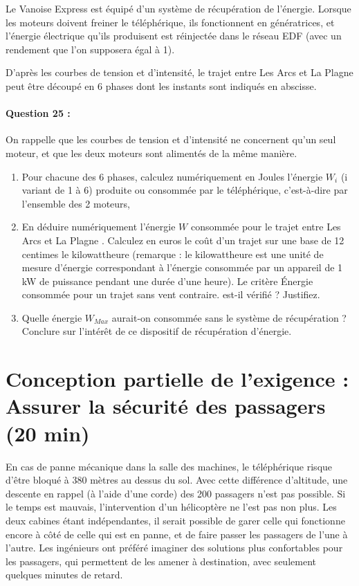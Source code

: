 Le Vanoise Express est équipé d'un système de récupération de l'énergie. Lorsque les moteurs doivent freiner le téléphérique, ils fonctionnent en génératrices, et l'énergie électrique qu'ils produisent est réinjectée dans le réseau EDF (avec un rendement que l'on supposera égal à 1).

D'après les courbes de tension et d'intensité, le trajet entre \og Les Arcs \fg et \og La Plagne \fg peut être découpé en 6 phases dont les instants sont indiqués en abscisse.

\paragraph{Question 25 :} On rappelle que les courbes de tension et d'intensité ne concernent qu'un seul moteur, et que les deux moteurs sont alimentés de la même manière.

\begin{enumerate}
 \item Pour chacune des 6 phases, calculez numériquement en Joules l'énergie $W_i$ (i variant de 1 à 6) produite ou consommée par le téléphérique, c'est-à-dire par l'ensemble des 2 moteurs,
 \item En déduire numériquement l'énergie $W$ consommée pour le trajet entre \og Les Arcs \fg et \og La Plagne \fg. Calculez en euros le coût d'un trajet sur une base de 12 centimes le kilowattheure (remarque : le kilowattheure est une unité de mesure d'énergie correspondant à l'énergie consommée par un appareil de 1 kW de puissance pendant une durée d'une heure). Le critère \og Énergie consommée pour un trajet sans vent contraire. \fg est-il vérifié ? Justifiez.
 \item Quelle énergie $W_{Max}$ aurait-on consommée sans le système de récupération ? Conclure sur l'intérêt de ce dispositif de récupération d'énergie.
\end{enumerate}

\section{Conception partielle de l'exigence : \og Assurer la sécurité des passagers \fg (20 min)}

En cas de panne mécanique dans la salle des machines, le téléphérique risque d'être bloqué à 380 mètres au dessus du sol. Avec cette différence d'altitude, une descente en rappel (à l'aide d'une corde) des 200 passagers n'est pas possible. Si le temps est mauvais, l'intervention d'un hélicoptère ne l'est pas non plus. Les deux cabines étant indépendantes, il serait possible de garer celle qui fonctionne encore à côté de celle qui est en panne, et de faire passer les passagers de l'une à l'autre. Les ingénieurs ont préféré imaginer des solutions plus confortables pour les passagers, qui permettent de les amener à destination, avec seulement quelques minutes de retard.

